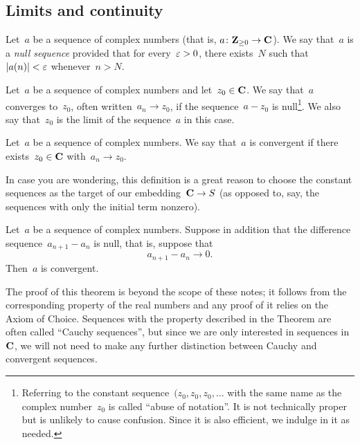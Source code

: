 \documentclass[twocolumn,12pt]{article}
\begin{document}
\subsection{Limits and continuity}
\begin{definition}
  Let~$a$ be a sequence of complex numbers (that is, $a \colon \mathbf{Z}_{\geq 0} \to \mathbf{C}$). We say that~$a$ is a \emph{null sequence} provided that for every~$\varepsilon > 0$, there exists~$N$ such that~$|a(n)| < \varepsilon$ whenever~$n > N$.
\end{definition}
\begin{definition}
  Let~$a$ be a sequence of complex numbers and let~$z_0 \in \mathbf{C}$. We say that~$a$ converges to~$z_0$, often written~$a_n \to z_0$, if the sequence~$a - z_0$ is null\footnote{Referring to the constant sequence~$(z_0, z_0, z_0, \ldots$ with the same name as the complex number~$z_0$ is called ``abuse of notation''. It is not technically proper but is unlikely to cause confusion. Since it is also efficient, we indulge in it as needed.}. We also say that~$z_0$ is the limit of the sequence~$a$ in this case.
\end{definition}
\begin{definition}
  Let~$a$ be a sequence of complex numbers. We say that~$a$ is convergent if there exists~$z_0 \in \mathbf{C}$ with~$a_n \to z_0$. 
\end{definition}
In case you are wondering, this definition is a great reason to choose the constant sequences as the target of our embedding~$\mathbf{C} \to S$ (as opposed to, say, the sequences with only the initial term nonzero).
\begin{Theorem}
  Let~$a$ be a sequence of complex numbers. Suppose in addition that the difference sequence~$a_{n+1} - a_{n}$ is null, that is, suppose that
  \[
    a_{n+1} - a_n \to 0.
  \]
  Then~$a$ is convergent.
\end{Theorem}
The proof of this theorem is beyond the scope of these notes; it follows from the corresponding property of the real numbers and any proof of it relies on the Axiom of Choice. Sequences with the property described in the Theorem are often called ``Cauchy sequences'', but since we are only interested in sequences in~$\mathbf{C}$, we will not need to make any further distinction between Cauchy and convergent sequences.
\end{document}
